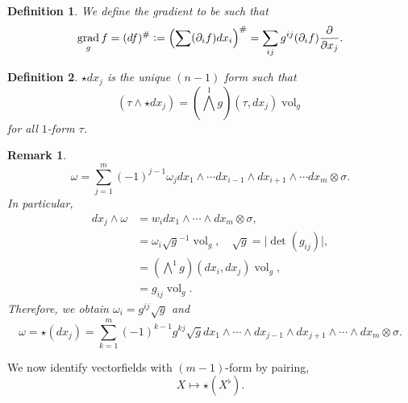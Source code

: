\documentclass[8pt]{article}
\newtheorem{definition}{Definition}[section]
\newtheorem{remark}{Remark}[section]
\DeclareMathOperator{\grad}{grad}
\DeclareMathOperator{\vol}{vol}
\newcommand{\defeq}{\vcentcolon=}
\newcommand{\pd}[2]{{\frac {\partial #1} {\partial #2}}}
\begin{document}

\begin{definition}
  We define the gradient to be such that 
  \begin{equation*}
    \grad_gf = (df)^\# \defeq \left(\sum (\partial_i f)dx_i\right)^\# = \sum_{ij}g^{ij}(\partial_i f)\pd{}{x_j}.
  \end{equation*}
\end{definition}

\begin{definition}
  $\star dx_j$ is the unique $(n-1)$ form such that 
  \begin{equation*}
    (\tau\wedge \star dx_j) = \left(\bigwedge^1 g\right)(\tau,dx_j)\vol_g
  \end{equation*}
  for all $1$-form $\tau$. 
\end{definition}

\begin{remark}
  \begin{equation*}
    \omega = \sum_{j=1}^m(-1)^{j-1}\omega_jdx_1\wedge\cdots dx_{i-1}\wedge dx_{i+1}\wedge\cdots dx_m\otimes\sigma.
  \end{equation*}
  In particular,
  \begin{align*}
    dx_j\wedge \omega & = w_idx_1\wedge \cdots \wedge dx_m\otimes \sigma,\\
    & = \omega_i\sqrt{g}^{-1}\vol_g,\quad \sqrt{g} = \vert \det (g_{ij})\vert,\\
    & = \left(\bigwedge^1 g\right)(dx_i,dx_j)\vol_g,\\
    & = g_{ij}\vol_g.
  \end{align*}
  Therefore, we obtain $\omega_i = g^{ij}\sqrt{g}$ and 
  \begin{equation*}
    \omega = \star(dx_j) = \sum_{k=1}^m (-1)^{k-1}g^{kj}\sqrt{g}dx_1\wedge\cdots\wedge dx_{j-1}\wedge dx_{j+1}\wedge\cdots \wedge dx_m\otimes\sigma.
  \end{equation*}
\end{remark}

We now identify vectorfields with $(m-1)$-form by pairing,
\begin{equation*}
  X\mapsto\star(X^\flat).
\end{equation*}
\end{document}
